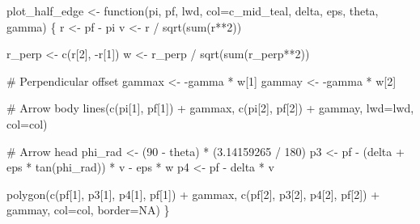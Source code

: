 \documentclass[
  letterpaper,
  DIV=11,
  numbers=noendperiod]{scrartcl}
\newenvironment{Shaded}{\begin{snugshade}}{\end{snugshade}}
\newcommand{\AttributeTok}[1]{\textcolor[rgb]{0.40,0.45,0.13}{#1}}
\newcommand{\CommentTok}[1]{\textcolor[rgb]{0.37,0.37,0.37}{#1}}
\newcommand{\ConstantTok}[1]{\textcolor[rgb]{0.56,0.35,0.01}{#1}}
\newcommand{\ControlFlowTok}[1]{\textcolor[rgb]{0.00,0.23,0.31}{#1}}
\newcommand{\DecValTok}[1]{\textcolor[rgb]{0.68,0.00,0.00}{#1}}
\newcommand{\FloatTok}[1]{\textcolor[rgb]{0.68,0.00,0.00}{#1}}
\newcommand{\FunctionTok}[1]{\textcolor[rgb]{0.28,0.35,0.67}{#1}}
\newcommand{\NormalTok}[1]{\textcolor[rgb]{0.00,0.23,0.31}{#1}}
\newcommand{\OtherTok}[1]{\textcolor[rgb]{0.00,0.23,0.31}{#1}}
\newcommand{\SpecialCharTok}[1]{\textcolor[rgb]{0.37,0.37,0.37}{#1}}
\begin{document}
\begin{Shaded}
\begin{Highlighting}[]
\NormalTok{plot\_half\_edge }\OtherTok{\textless{}{-}} \ControlFlowTok{function}\NormalTok{(pi, pf, lwd, }\AttributeTok{col=}\NormalTok{c\_mid\_teal,}
\NormalTok{                           delta, eps, theta, gamma) \{}
\NormalTok{  r }\OtherTok{\textless{}{-}}\NormalTok{ pf }\SpecialCharTok{{-}}\NormalTok{ pi}
\NormalTok{  v }\OtherTok{\textless{}{-}}\NormalTok{ r }\SpecialCharTok{/} \FunctionTok{sqrt}\NormalTok{(}\FunctionTok{sum}\NormalTok{(r}\SpecialCharTok{**}\DecValTok{2}\NormalTok{))}

\NormalTok{  r\_perp }\OtherTok{\textless{}{-}} \FunctionTok{c}\NormalTok{(r[}\DecValTok{2}\NormalTok{], }\SpecialCharTok{{-}}\NormalTok{r[}\DecValTok{1}\NormalTok{])}
\NormalTok{  w }\OtherTok{\textless{}{-}}\NormalTok{ r\_perp }\SpecialCharTok{/} \FunctionTok{sqrt}\NormalTok{(}\FunctionTok{sum}\NormalTok{(r\_perp}\SpecialCharTok{**}\DecValTok{2}\NormalTok{))}

  \CommentTok{\# Perpendicular offset}
\NormalTok{  gammax }\OtherTok{\textless{}{-}} \SpecialCharTok{{-}}\NormalTok{gamma }\SpecialCharTok{*}\NormalTok{ w[}\DecValTok{1}\NormalTok{]}
\NormalTok{  gammay }\OtherTok{\textless{}{-}} \SpecialCharTok{{-}}\NormalTok{gamma }\SpecialCharTok{*}\NormalTok{ w[}\DecValTok{2}\NormalTok{]}

  \CommentTok{\# Arrow body}
  \FunctionTok{lines}\NormalTok{(}\FunctionTok{c}\NormalTok{(pi[}\DecValTok{1}\NormalTok{], pf[}\DecValTok{1}\NormalTok{]) }\SpecialCharTok{+}\NormalTok{ gammax,}
        \FunctionTok{c}\NormalTok{(pi[}\DecValTok{2}\NormalTok{], pf[}\DecValTok{2}\NormalTok{]) }\SpecialCharTok{+}\NormalTok{ gammay,}
        \AttributeTok{lwd=}\NormalTok{lwd, }\AttributeTok{col=}\NormalTok{col)}

  \CommentTok{\# Arrow head}
\NormalTok{  phi\_rad }\OtherTok{\textless{}{-}}\NormalTok{ (}\DecValTok{90} \SpecialCharTok{{-}}\NormalTok{ theta) }\SpecialCharTok{*}\NormalTok{ (}\FloatTok{3.14159265} \SpecialCharTok{/} \DecValTok{180}\NormalTok{)}
\NormalTok{  p3 }\OtherTok{\textless{}{-}}\NormalTok{ pf }\SpecialCharTok{{-}}\NormalTok{ (delta }\SpecialCharTok{+}\NormalTok{ eps }\SpecialCharTok{*} \FunctionTok{tan}\NormalTok{(phi\_rad)) }\SpecialCharTok{*}\NormalTok{ v }\SpecialCharTok{{-}}\NormalTok{ eps }\SpecialCharTok{*}\NormalTok{ w}
\NormalTok{  p4 }\OtherTok{\textless{}{-}}\NormalTok{ pf }\SpecialCharTok{{-}}\NormalTok{ delta }\SpecialCharTok{*}\NormalTok{ v}

  \FunctionTok{polygon}\NormalTok{(}\FunctionTok{c}\NormalTok{(pf[}\DecValTok{1}\NormalTok{], p3[}\DecValTok{1}\NormalTok{], p4[}\DecValTok{1}\NormalTok{], pf[}\DecValTok{1}\NormalTok{]) }\SpecialCharTok{+}\NormalTok{ gammax,}
          \FunctionTok{c}\NormalTok{(pf[}\DecValTok{2}\NormalTok{], p3[}\DecValTok{2}\NormalTok{], p4[}\DecValTok{2}\NormalTok{], pf[}\DecValTok{2}\NormalTok{]) }\SpecialCharTok{+}\NormalTok{ gammay,}
          \AttributeTok{col=}\NormalTok{col, }\AttributeTok{border=}\ConstantTok{NA}\NormalTok{)}
\NormalTok{\}}
\end{Highlighting}
\end{Shaded}
\end{document}
